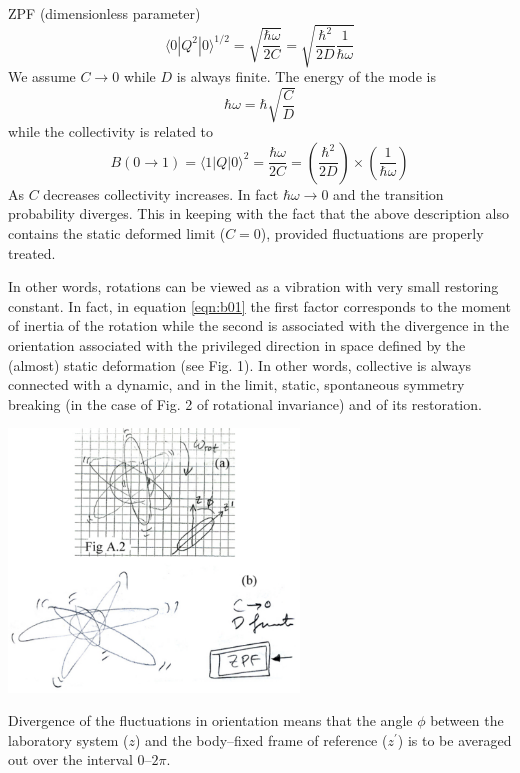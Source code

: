\documentclass[a4paper,onecolumn,superscriptaddress,12pt,nofootinbib,twoside,raggedfooter,notitlepage]{revtex4-1}
\begin{document}
ZPF (dimensionless parameter)
\begin{equation}
	\langle 0|Q^2|0 \rangle^{1/2} = \sqrt{\frac{\hbar \omega}{2C}} = \sqrt{\frac{\hbar^2}{2D}\frac{1}{\hbar\omega}}
\end{equation}
We assume $C \rightarrow 0$ while $D$ is always finite. The energy of the mode is
\begin{equation}
	\hbar \omega = \hbar \sqrt{\frac{C}{D}}
\end{equation}
while the collectivity is related to
\begin{equation}
	B (0 \rightarrow 1) = \langle 1|Q|0 \rangle^2 = \frac{\hbar \omega}{2C} = \left( \frac{\hbar^2}{2D} \right) \times \left( \frac{1}{\hbar \omega} \right)
	\label{eqn:b01}
\end{equation}
As $C$ decreases collectivity increases. In fact $\hbar \omega \rightarrow 0$ and the transition probability diverges. This in keeping with the fact that the above description also contains the static deformed limit ($C=0$), provided fluctuations are properly treated.

In other words, rotations can be viewed as a vibration with very small restoring constant. In fact, in equation \ref{eqn:b01} the first factor corresponds to the moment of inertia of the rotation while the second is associated with the divergence in the orientation associated with the privileged direction in space defined by the (almost) static deformation (see Fig. 1). In other words, collective is always connected with a dynamic, and in the limit, static, spontaneous symmetry breaking (in the case of Fig. 2 of rotational invariance) and of its restoration.
\begin{center}
	\includegraphics[width=0.58\textwidth]{figs/fig_rotinv}
\end{center}
Divergence of the fluctuations in orientation means that the angle $\phi$ between the laboratory system ($z$) and the body--fixed frame of reference ($z^\prime$) is to be averaged out over the interval $0$--$2\pi$.
\end{document}
